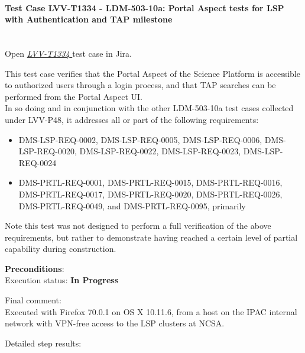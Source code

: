 \documentclass[DM,lsstdraft,STR,toc]{lsstdoc}
\providecommand{\tightlist}{
  \setlength{\itemsep}{0pt}\setlength{\parskip}{0pt}}
\begin{document}
    \paragraph{Test Case LVV-T1334 - LDM-503-10a: Portal Aspect tests for LSP with Authentication and TAP
milestone
 }\mbox{}\\

Open  \href{https://jira.lsstcorp.org/secure/Tests.jspa#/testCase/LVV-T1334}{\textit{ LVV-T1334 } }
test case in Jira.

    This test case verifies that the Portal Aspect of the Science Platform
is accessible to authorized users through a login process, and that TAP
searches can be performed from the Portal Aspect UI.\\[2\baselineskip]In
so doing and in conjunction with the other LDM-503-10a test cases
collected under LVV-P48, it addresses all or part of the following
requirements:

\begin{itemize}
\tightlist
\item
  DMS-LSP-REQ-0002, DMS-LSP-REQ-0005, DMS-LSP-REQ-0006,
  DMS-LSP-REQ-0020, DMS-LSP-REQ-0022, DMS-LSP-REQ-0023, DMS-LSP-REQ-0024
\item
  DMS-PRTL-REQ-0001, DMS-PRTL-REQ-0015, DMS-PRTL-REQ-0016,
  DMS-PRTL-REQ-0017, DMS-PRTL-REQ-0020, DMS-PRTL-REQ-0026,
  DMS-PRTL-REQ-0049, and DMS-PRTL-REQ-0095, primarily
\end{itemize}

Note this test was not designed to perform a full verification of the
above requirements, but rather to demonstrate having reached a certain
level of partial capability during construction.


    \textbf{ Preconditions}:\\
    

    Execution status: {\bf In Progress }

    Final comment:\\Executed with Firefox 70.0.1 on OS X 10.11.6, from a host on the IPAC
internal network with VPN-free access to the LSP clusters at NCSA.



    Detailed step results:
\end{document}
